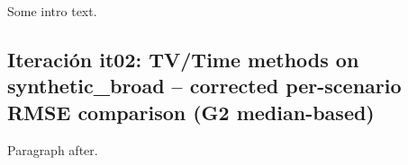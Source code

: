 \documentclass{article}
\DeclareRobustCommand{\code}[1]{\texttt{\detokenize{#1}}}
\def\texttt#1{#1}%
\def\code#1{#1}%
\begin{document}
Some intro text.
\subsection[Iteración it02]{Iteración \code{it02}: TV/Time methods on synthetic_broad -- corrected per-scenario RMSE comparison (G2 median-based)}
Paragraph after.
\end{document}
